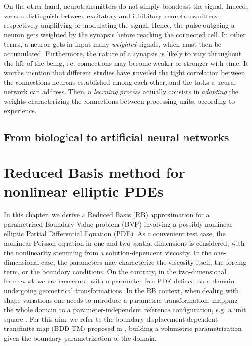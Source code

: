 \documentclass[11pt, a4paper, twoside, openright]{report}
\theoremstyle{theorem}
\numberwithin{equation}{section}
\numberwithin{figure}{section}
\begin{document}
		On the other hand, neurotransmitters do not simply broadcast the signal. Indeed, we can distinguish between excitatory and inhibitory neurotransmitters, respectively amplifying or modulating the signal. Hence, the pulse outgoing a neuron gets weighted by the synapsis before reaching the connected cell. In other terms, a neuron gets in input many \emph{weighted} signals, which must then be accumulated. Furthermore, the nature of a synapsis is likely to vary throughout the life of the being, i.e. connections may become weaker or stronger with time. It worths mention that different studies have unveiled the tight correlation between the connections neurons established among each other, and the tasks a neural network can address. Then, a \emph{learning process} actually consists in \emph{adapting} the weights characterizing the connections between processing units, according to experience.
		
		
		
		
	\section{From biological to artificial neural networks}
	\label{section:From biological to artificial neural networks}
		
		
		
		
		
		 

	\chapter{Reduced Basis method for nonlinear elliptic PDEs}
	\label{chapter:Reduced Basis method for nonlinear elliptic PDEs}
	
		In this chapter, we derive a Reduced Basis (RB) approximation for a parametrized Boundary Value problem (BVP) involving a possibly nonlinear elliptic Partial Differential Equation (PDE). As a convenient test case, the nonlinear Poisson equation in one and two spatial dimensions is considered, with the nonlinearity stemming from a solution-dependent viscosity. In the one-dimensional case, the parameters may characterize the viscosity itself, the forcing term, or the boundary conditions. On the contrary, in the two-dimensional framework we are concerned with a parameter-free PDE defined on a domain undergoing geometrical transformations. In the RB context, when dealing with shape variations one needs to introduce a parametric transformation, mapping the whole domain to a parameter-independent reference configuration, e.g. a unit square \cite{MN16}. For this aim, we refer to the boundary displacement-dependent transfinite map (BDD TM) proposed in \cite{JIR14}, building a volumetric parametrization given the boundary parametrization of the domain. 
		
\end{document}
